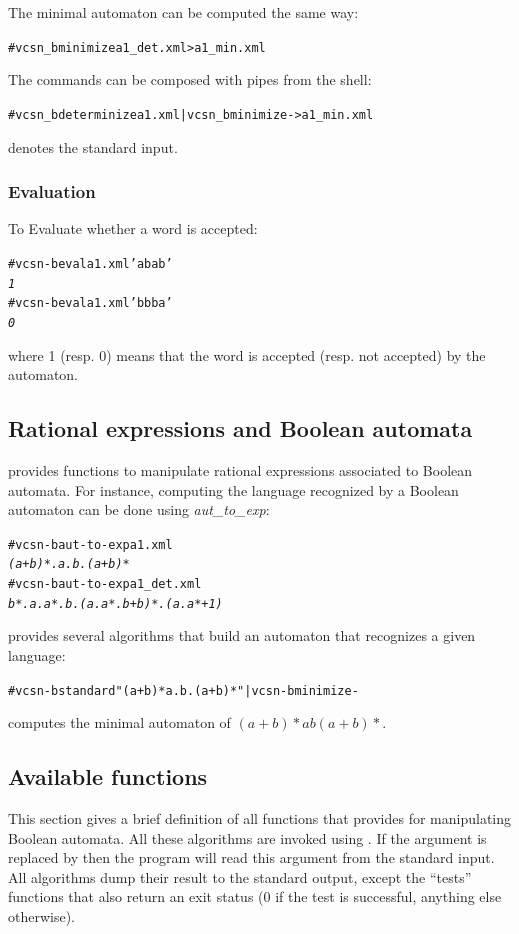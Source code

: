 The minimal automaton can be computed the same way:
\begin{alltt}
# vcsn_b minimize a1_det.xml > a1_min.xml
\end{alltt}
The commands can be composed with pipes from the shell:
\begin{alltt}
# vcsn_b determinize a1.xml | vcsn_b minimize - > a1_min.xml
\end{alltt}

\samp{-} denotes the standard input.

\subsubsection{Evaluation}

To Evaluate whether a word is accepted:
\begin{alltt}
# vcsn-b eval a1.xml 'abab'
\textit{1}
# vcsn-b eval a1.xml 'bbba'
\textit{0}
\end{alltt}
where 1 (resp. 0) means that the word is accepted (resp. not accepted)
by the automaton.

\subsection{Rational expressions and Boolean automata}

\Vauc provides functions to manipulate rational expressions associated
to Boolean automata. For instance, computing the language recognized
by a Boolean automaton can be done using \textit{aut\_to\_exp}:
\begin{alltt}
# vcsn-b aut-to-exp a1.xml
\textit{(a+b)*.a.b.(a+b)*}
# vcsn-b aut-to-exp a1_det.xml
\textit{b*.a.a*.b.(a.a*.b+b)*.(a.a*+1)}
\end{alltt}

\Vauc provides several algorithms that build an automaton that
recognizes a given language:
\begin{alltt}
# vcsn-b standard "(a+b)*a.b.(a+b)*" | vcsn-b minimize -
\end{alltt}
computes the minimal automaton of $(a+b)*ab(a+b)*$.

\subsection{Available functions}
This section gives a brief definition of all functions that \Vauc
provides for manipulating Boolean automata.  All these algorithms are
invoked using . If
the argument is replaced by \samp{-} then the program will read this
argument from the standard input.  All algorithms dump their result to
the standard output, except the ``tests'' functions that also return
an exit status (0 if the test is successful, anything else otherwise).

